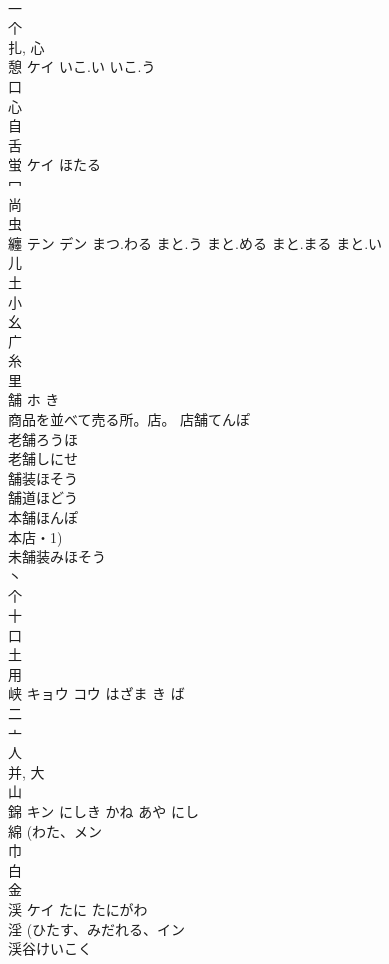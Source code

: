 \documentclass[8pt]{extreport}
\begin{document}
\begin{CJK}{UTF8}{min}
\\	一 
\\	个 
\\	扎, 心 
\\	憩	ケイ	いこ.い いこ.う	
\\	口 
\\	心 
\\	自 
\\	舌 
\\	蛍	ケイ	ほたる	
\\	冖 
\\	尚 
\\	虫 
\\	纏	テン デン	まつ.わる まと.う まと.める まと.まる まと.い	
\\	儿 
\\	土 
\\	小 
\\	幺 
\\	广 
\\	糸 
\\	里 
\\	舗	ホ	き	
\\	商品を並べて売る所。店。		店舗てんぽ 
\\	老舗ろうほ 
\\	老舗しにせ 
\\	舗装ほそう 
\\	舗道ほどう 
\\	本舗ほんぽ 
\\	本店・1) 
\\	未舗装みほそう 
\\	丶 
\\	个 
\\	十 
\\	口 
\\	土 
\\	用 
\\	峡	キョウ コウ	はざま き ば	
\\	二 
\\	亠 
\\	人 
\\	并, 大 
\\	山 
\\	錦	キン	にしき かね あや にし	
\\	綿 (わた、メン 
\\	巾 
\\	白 
\\	金 
\\	渓	ケイ	たに たにがわ	
\\	淫 (ひたす、みだれる、イン 
\\	渓谷けいこく 

\end{CJK}
\end{document}
